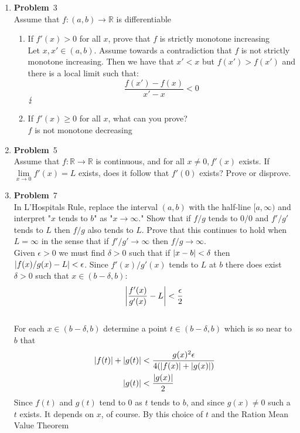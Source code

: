 \documentclass[12pt]{amsart}
\newcommand{\benu}{\begin{enumerate}}
\newcommand{\eenu}{\end{enumerate}}
\theoremstyle{definition}
\newcommand{\mbR}{\mathbb{R}}
\newcommand{\ep}{\epsilon}
\newcommand{\itep}{\item {\bfseries Problem}\ }
\DeclarePairedDelimiter\abs{\lvert}{\rvert}
\begin{document}
\begin{enumerate}[series=p]
\itep 3\\
Assume that $f:(a,b) \to \mbR$ is differentiable
	\benu
		\item If $f'(x) > 0$ for all $x$, prove that $f$ is strictly monotone increasing\\
		
		Let $x, x' \in (a,b)$.  Assume towards a contradiction that $f$ is not strictly monotone increasing.  Then we have that $x' < x$ but $f(x') > f(x')$ and there is a local limit such that:
		$$\frac{f(x') - f(x)}{x' - x} < 0$$$
			\hfill\lightning$
			\\
		\item If $f'(x) \geq 0$ for all $x$, what can you prove?\\
		
		$f$ is not monotone decreasing
	\eenu

\newpage

\itep 5\\
Assume that $f: \mbR \to \mbR$ is continuous, and for all $x \neq 0, f'(x)$ exists.  If $\lim\limits_{x \to 0} f'(x) = L$ exists, does it follow that $f'(0)$ exists?  Prove or disprove.

\newpage
\itep 7\\
In L'Hospitals Rule, replace the interval $(a,b)$ with the half-line $[a, \infty)$ and interpret "$x$ tends to $b$" as "$x \to \infty$."  Show that if $f/g$ tends to $0/0$ and $f'/g'$ tends to $L$ then $f/g$ also tends to $L$.  Prove that this continues to hold when $L = \infty$ in the sense that if $f'/g' \to \infty$ then $f/g \to \infty$.
\\

Given $\ep > 0$ we must find $\delta > 0$ such that if $\abs{x - b} < \delta$ then $\abs{f(x)/g(x) - L} < \epsilon$.  Since $f'(x)/g'(x)$ tends to $L$ at $b$ there does exist $\delta > 0$ such that $x \in (b - \delta, b)$:
$$\abs*{\frac{f'(x)}{g'(x)} -L } < \frac{\epsilon}{2}$$\\
For each $x \in (b - \delta, b)$ determine a point $t \in (b - \delta, b)$ which is so near to $b$ that
\begin{align*}
\abs{f(t)} + \abs{g(t)} &< \frac{g(x)^2 \ep}{4(\abs{f(x)} + \abs{g(x)})}\\
\abs{g(t)} &< \frac{\abs{g(x)}}{2}
\end{align*}
Since $f(t)$ and $g(t)$ tend to 0 as $t$ tends to $b$, and since $g(x) \neq 0$ such a $t$ exists.  It depends on $x$, of course.  By this choice of $t$ and the Ration Mean Value Theorem


\end{enumerate}
\end{document}
